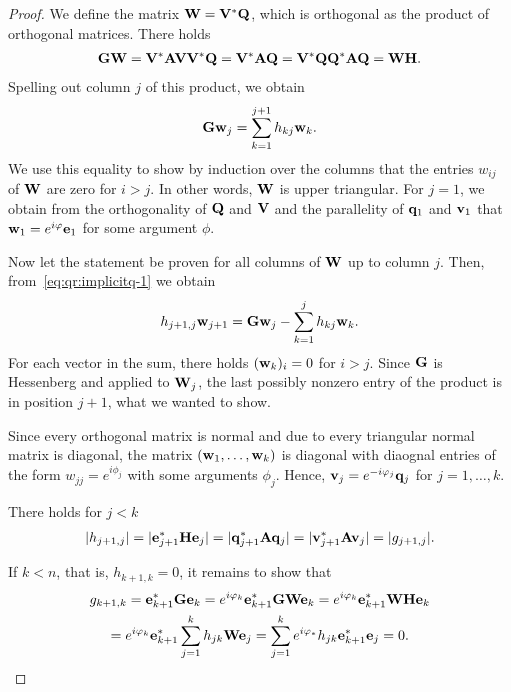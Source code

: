 \begin{proof}
  We define the matrix $\mathbf W = \mathbf V^*\mathbf Q$, which is orthogonal as the product of orthogonal matrices. There holds
  \begin{gather}
    \mathbf G\mathbf W = \mathbf V^*\mathbf A\mathbf V\mathbf V^*\mathbf Q = \mathbf V^*\mathbf A\mathbf Q
    = \mathbf V^*\mathbf Q\mathbf Q^*\mathbf A\mathbf Q = \mathbf W\mathbf H.
  \end{gather}
  Spelling out column $j$ of this product, we obtain
  \begin{gather}
    \label{eq:qr:implicitq-1}
    \mathbf G\mathbf w_j = \sum_{k=1}^{j+1} h_{kj} \mathbf w_{k}.
  \end{gather}
  We use this equality to show by induction over the columns that the
  entries $w_{ij}$ of $\mathbf W$ are zero for $i>j$. In other words,
  $\mathbf W$ is upper triangular.  For $j=1$, we obtain from the
  orthogonality of $\mathbf Q$ and $\mathbf V$ and the parallelity of $\mathbf q_1$
  and $\mathbf v_1$ that $\mathbf w_1 = e^{i\varphi} \mathbf e_1$ for some argument $\phi$.

  Now let the statement be proven for all columns of $\mathbf W$ up to
  column $j$. Then, from~\eqref{eq:qr:implicitq-1} we obtain
  \begin{gather}
    h_{j+1,j}\mathbf w_{j+1} = \mathbf G\mathbf w_j - \sum_{k=1}^j h_{kj} \mathbf w_{k}.
  \end{gather}
  For each vector in the sum, there holds $(\mathbf w_{k})_i = 0$ for
  $i>j$. Since $\mathbf G$ is Hessenberg and applied to $\mathbf W_j$, the
  last possibly nonzero entry of the product is in position $j+1$,
  what we wanted to show.

  Since every orthogonal matrix is normal and due to
   every triangular
  normal matrix is diagonal, the matrix $(\mathbf w_1,\dots,\mathbf w_k)$ is diagonal with
  diaognal entries of the form $w_{jj} = e^{i\phi_j}$ with some
  arguments $\phi_j$. Hence, $\mathbf v_j = e^{-i\varphi_j} \mathbf q_j$ for $j=1,\dots,k$.

  There holds for $j<k$
  \begin{gather}
    \lvert h_{j+1,j}\rvert = \lvert\mathbf e_{j+1}^*\mathbf H\mathbf e_j\rvert = \lvert\mathbf q_{j+1}^*\mathbf A\mathbf q_j\rvert
    = \lvert\mathbf v_{j+1}^*\mathbf A\mathbf v_j\rvert = \lvert g_{j+1,j}\rvert.
  \end{gather}

  If $k<n$, that is, $h_{k+1,k}=0$, it remains to show that
  \begin{multline}
    g_{k+1,k} = \mathbf e_{k+1}^*\mathbf G\mathbf e_k = e^{i\varphi_k}\mathbf e_{k+1}^*\mathbf G\mathbf W\mathbf e_k
    =  e^{i\varphi_k}\mathbf e_{k+1}^*\mathbf W\mathbf H\mathbf e_k\\
    =  e^{i\varphi_k}\mathbf e_{k+1}^* \sum_{j=1}^k h_{jk} \mathbf W\mathbf e_j
    =  \sum_{j=1}^k e^{i\varphi_*} h_{jk} \mathbf e_{k+1}^* \mathbf e_j = 0.
  \end{multline}
\end{proof}

